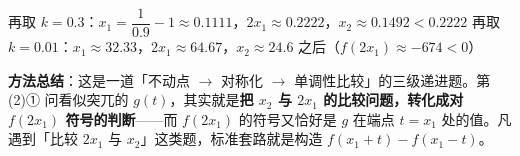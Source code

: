 \begin{answer}
\begin{gktip}
再取 $k=0.3$：$x_1=\dfrac1{0.9}-1\approx0.1111$，$2x_1\approx0.2222$，$x_2\approx0.1492<0.2222$ 
再取 $k=0.01$：$x_1\approx32.33$，$2x_1\approx64.67$，$x_2\approx24.6$ 之后（$f\left(2x_1\right)\approx-674<0$）

\textbf{方法总结}：这是一道「不动点 $\to$ 对称化 $\to$ 单调性比较」的三级递进题。第 (2)① 问看似突兀的 $g(t)$，其实就是\textbf{把 $x_2$ 与 $2x_1$ 的比较问题，转化成对 $f\left(2x_1\right)$ 符号的判断}——而 $f\left(2x_1\right)$ 的符号又恰好是 $g$ 在端点 $t=x_1$ 处的值。凡遇到「比较 $2x_1$ 与 $x_2$」这类题，标准套路就是构造 $f\left(x_1+t\right)-f\left(x_1-t\right)$。
\end{gktip}



\par\medskip

\end{answer}
